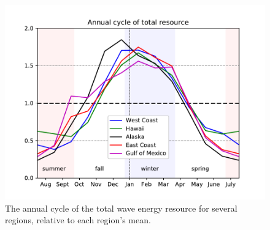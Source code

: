 

\begin{figure}[ht]
  \centering
  \includegraphics[width=\textwidth]{../../fig/AnnualCycle01.pdf}
  \caption[Wave resource annual cycle.]{The annual cycle of the total wave energy resource for several regions, relative to each region's mean.}
  \label{fig:annual-cycle}
\end{figure}



